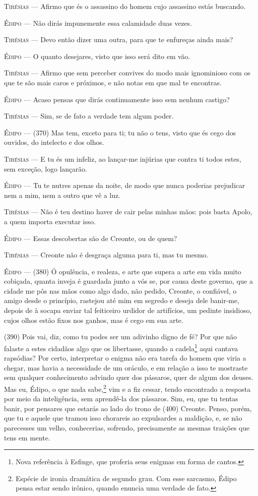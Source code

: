 \textsc{Tirésias} --- Afirmo que és o assassino do homem cujo assassino estás buscando.

\textsc{Édipo} --- Não dirás impunemente essa calamidade duas vezes.

\textsc{Tirésias} --- Devo então dizer uma outra, para que te enfureças ainda mais?

\textsc{Édipo} --- O quanto desejares, visto que isso será dito em vão.

\textsc{Tirésias} --- Afirmo que sem perceber convives do modo mais ignominioso com os que te
são mais caros e próximos, e não notas em que mal te encontras.

\textsc{Édipo} --- Acaso pensas que dirás continuamente isso sem nenhum castigo?

\textsc{Tirésias} --- Sim, se de fato a verdade tem algum poder.

\textsc{Édipo} --- (370) Mas tem, exceto para ti; tu não o tens, visto que és cego dos
ouvidos, do intelecto e dos olhos.

\textsc{Tirésias} --- E tu és um infeliz, ao lançar-me injúrias que contra ti todos estes, sem
exceção, logo lançarão.

\textsc{Édipo} --- Tu te nutres apenas da noite, de modo que nunca poderias prejudicar nem
a mim, nem a outro que vê a luz.

\textsc{Tirésias} --- Não é teu destino haver de cair pelas minhas mãos: pois basta Apolo, a
quem importa executar isso.

\textsc{Édipo} --- Essas descobertas são de Creonte, ou de quem?

\textsc{Tirésias} --- Creonte não é desgraça alguma para ti, mas tu mesmo.

\textsc{Édipo} --- (380) Ó opulência, e realeza, e arte que supera a arte em vida muito
cobiçada, quanta inveja é guardada junto a vós se, por causa deste
governo, que a cidade me pôs nas mãos como algo dado, não pedido,
Creonte, o confiável, o amigo desde o princípio, rastejou até mim em
segredo e deseja dele banir-me, depois de à socapa enviar tal feiticeiro
urdidor de artifícios, um pedinte insidioso, cujos olhos estão fixos nos
ganhos, mas é cego em sua arte.

(390) Pois vai, diz, como tu podes ser um adivinho digno de fé? Por que
não falaste a estes cidadãos algo que os libertasse, quando a
cadela\footnote{Nova referência à Esfinge, que proferia seus enigmas em
  forma de cantos.} aqui cantava rapsódias? Por certo, interpretar o
enigma não era tarefa do homem que viria a chegar, mas havia a
necessidade de um oráculo, e em relação a isso te mostraste sem qualquer
conhecimento advindo quer dos pássaros, quer de algum dos deuses. Mas
eu, Édipo, o que nada sabe,\footnote{Espécie de ironia dramática de
  segundo grau. Com esse sarcasmo, Édipo pensa estar sendo irônico,
  quando enuncia uma verdade de fato.} vim e a fiz cessar,
tendo encontrado a resposta por meio da inteligência, sem aprendê-la dos
pássaros. Sim, eu, que tu tentas banir, por pensares que estarás ao lado
do trono de (400) Creonte. Penso, porém, que tu e aquele que tramou isso
chorareis ao expulsardes a maldição, e, se não parecesses um velho,
conhecerias, sofrendo, precisamente as mesmas traições que tens em
mente.

